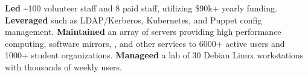 \begin{minipage}[t]{0.665\textwidth}
\begin{adjustwidth}{10pt}{}
    \textbf{Led} \textasciitilde{}100 volunteer staff and 8 paid staff, utilizing \$90k+ yearly funding.
    \textbf{Leveraged}  such as LDAP/Kerberos, Kubernetes, and Puppet config management.
    \textbf{Maintained} an array of servers providing high performance computing, software mirrors, , and other services to 6000+ active users and 1000+ student organizations.
    \textbf{Manageed} a lab of 30 Debian Linux workstations with thousands of weekly users.

  \end{adjustwidth}









\end{minipage}
